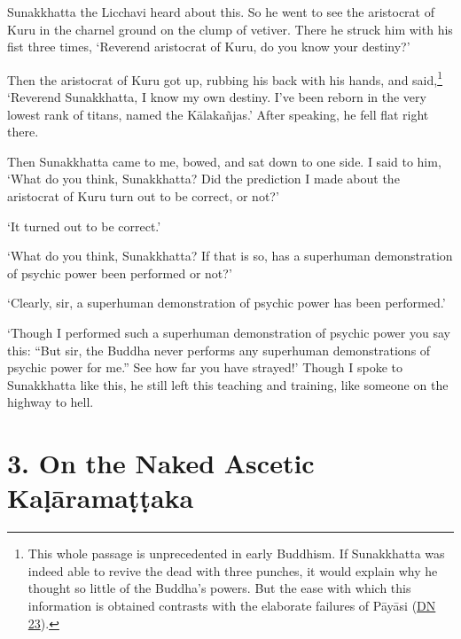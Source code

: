 \documentclass[12pt,openany]{book}%
\begin{document}
Sunakkhatta the Licchavi heard about this. So he went to see the aristocrat of Kuru in the charnel ground on the clump of vetiver. There he struck him with his fist three times, ‘Reverend aristocrat of Kuru, do you know your destiny?’ 

Then the aristocrat of Kuru got up, rubbing his back with his hands, and said,\footnote{This whole passage is unprecedented in early Buddhism. If Sunakkhatta was indeed able to revive the dead with three punches, it would explain why he thought so little of the Buddha’s powers. But the ease with which this information is obtained contrasts with the elaborate failures of \textsanskrit{Pāyāsi} (\href{https://suttacentral.net/dn23/en/sujato}{DN 23}). } ‘Reverend Sunakkhatta, I know my own destiny. I’ve been reborn in the very lowest rank of titans, named the \textsanskrit{Kālakañjas}.’ After speaking, he fell flat right there. 

Then Sunakkhatta came to me, bowed, and sat down to one side. I said to him, ‘What do you think, Sunakkhatta? Did the prediction I made about the aristocrat of Kuru turn out to be correct, or not?’ 

‘It turned out to be correct.’ 

‘What do you think, Sunakkhatta? If that is so, has a superhuman demonstration of psychic power been performed or not?’ 

‘Clearly, sir, a superhuman demonstration of psychic power has been performed.’ 

‘Though I performed such a superhuman demonstration of psychic power you say this: “But sir, the Buddha never performs any superhuman demonstrations of psychic power for me.” See how far you have strayed!’ Though I spoke to Sunakkhatta like this, he still left this teaching and training, like someone on the highway to hell. 

\section*{3. On the Naked Ascetic \textsanskrit{Kaḷāramaṭṭaka} }
\end{document}
